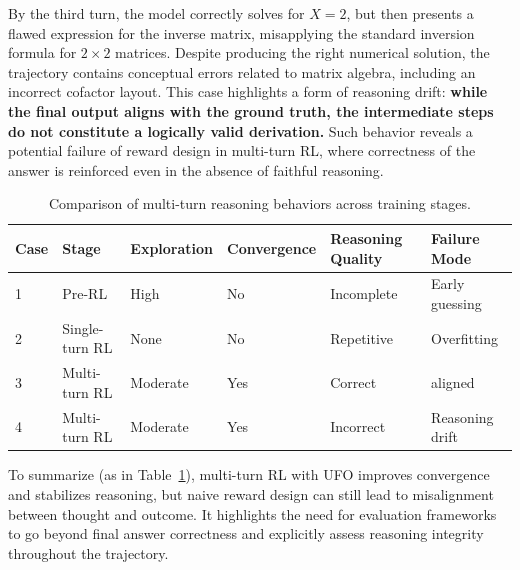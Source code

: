 By the third turn, the model correctly solves for \(X = 2\), but then presents a flawed expression for the inverse matrix, misapplying the standard inversion formula for \(2 \times 2\) matrices. Despite producing the right numerical solution, the trajectory contains conceptual errors related to matrix algebra, including an incorrect cofactor layout. This case highlights a form of reasoning drift: \textbf{while the final output aligns with the ground truth, the intermediate steps do not constitute a logically valid derivation.} Such behavior reveals a potential failure of reward design in multi-turn RL, where correctness of the answer is reinforced even in the absence of faithful reasoning.



\begin{table}[t]
\centering
\caption{Comparison of multi-turn reasoning behaviors across training stages.}
\begin{tabular}{@{}llllll@{}}
\toprule
\textbf{Case} & \textbf{Stage} & \textbf{Exploration} & \textbf{Convergence} & \textbf{Reasoning Quality} & \textbf{Failure Mode} \\
\midrule
1 & Pre-RL           & High      & No    & Incomplete         & Early guessing \\
2 & Single-turn RL   & None      & No    & Repetitive         & Overfitting     \\
3 & Multi-turn RL   & Moderate  & Yes   & Correct & aligned              \\
4 & Multi-turn RL   & Moderate  & Yes   & Incorrect          & Reasoning drift \\
\bottomrule
\end{tabular}
\label{tab:cases_summary}
\end{table}

To summarize (as in Table~\ref{tab:cases_summary}), multi-turn RL with UFO improves convergence and stabilizes reasoning, but naive reward design can still lead to misalignment between thought and outcome. It highlights the need for evaluation frameworks to go beyond final answer correctness and explicitly assess reasoning integrity throughout the trajectory.


